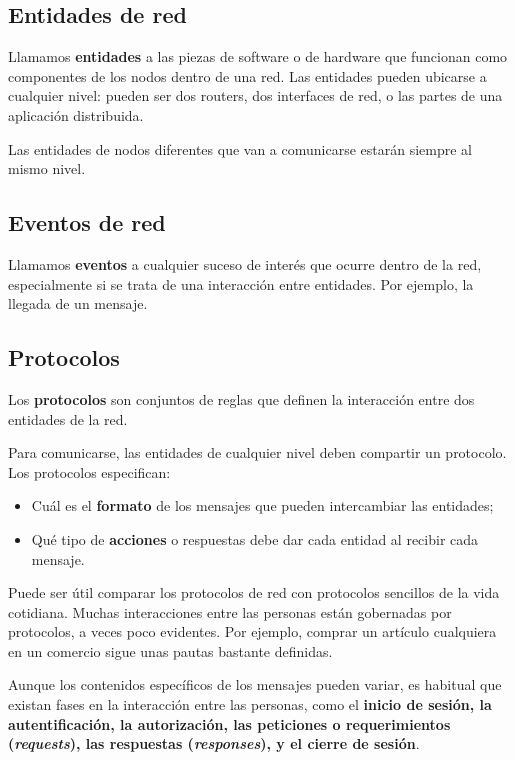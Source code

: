 \documentclass[spanish,A4,]{article}
\begin{document}
\subsection{Entidades de red}\label{entidades-de-red}

Llamamos \textbf{entidades} a las piezas de software o de hardware que
funcionan como componentes de los nodos dentro de una red. Las entidades
pueden ubicarse a cualquier nivel: pueden ser dos routers, dos
interfaces de red, o las partes de una aplicación distribuida.

Las entidades de nodos diferentes que van a comunicarse estarán siempre
al mismo nivel.

\subsection{Eventos de red}\label{eventos-de-red}

Llamamos \textbf{eventos} a cualquier suceso de interés que ocurre
dentro de la red, especialmente si se trata de una interacción entre
entidades. Por ejemplo, la llegada de un mensaje.

\subsection{Protocolos}\label{protocolos}

Los \textbf{protocolos} son conjuntos de reglas que definen la
interacción entre dos entidades de la red.

Para comunicarse, las entidades de cualquier nivel deben compartir un
protocolo. Los protocolos especifican:

\begin{itemize}
\itemsep1pt\parskip0pt
\item
  Cuál es el \textbf{formato} de los mensajes que pueden intercambiar
  las entidades;
\item
  Qué tipo de \textbf{acciones} o respuestas debe dar cada entidad al
  recibir cada mensaje.
\end{itemize}

Puede ser útil comparar los protocolos de red con protocolos sencillos
de la vida cotidiana. Muchas interacciones entre las personas están
gobernadas por protocolos, a veces poco evidentes. Por ejemplo, comprar
un artículo cualquiera en un comercio sigue unas pautas bastante
definidas.

Aunque los contenidos específicos de los mensajes pueden variar, es
habitual que existan fases en la interacción entre las personas, como el
\textbf{inicio de sesión, la autentificación, la autorización, las
peticiones o requerimientos (\emph{requests}), las respuestas
(\emph{responses}), y el cierre de sesión}.
\end{document}
